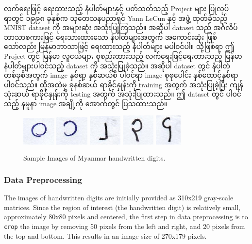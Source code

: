 လက်ရေးဖြင့် ရေးထားသည့် နံပါတ်များနှင့် ပတ်သတ်သည့် Project များ ပြုလုပ်ရာတွင် ၁၉၉၈ ခုနှစ်က သုတေသနပညာရှင် Yann LeCun နှင့် အဖွဲ့ ထုတ်ခဲ့သည့်  MNIST dataset ကို အများဆုံး အသုံးပြုကြသည်။ အဆိုပါ dataset သည်  အင်္ဂလိပ် ဘာသာစကားဖြင့် ရေးသားထားသော နံပါတ်များအတွက် အကောင်းဆုံး ဖြစ်သော်လည်း မြန်မာဘာသာဖြင့် ရေးထားသည့် နံပါတ်များ မပါ၀င်ပါ။ သို့ဖြစ်ရာ ဤ Project တွင် မြန်မာ လူငယ်များ စုစည်းထားသည့် လက်ရေးဖြင့်ရေးထားသည့် မြန်မာ နံပါတ်များပါ၀င်သည့် dataset ကို အသုံးပြုခဲ့သည်။ အဆိုပါ dataset တွင် နံပါတ် တစ်ခုစီအတွက် image နှစ်ရာ့ နှစ်ဆယ်စီ ပါ၀င်ရာ image စုစုပေါင်း နှစ်ထောင့်နှစ်ရာ ပါ၀င်သည်။ ထိုအထဲမှ ခုနစ်ဆယ် ရာခိုင်နှုန်းကို training အတွက် အသုံးပြုခဲ့ပြီး ကျန် သုံးဆယ် ရာခိုင်နှုန်းကို testing အတွက် အသုံးပြုထားသည်။ ဤ dataset တွင် ပါ၀င်သည့် နမူနာ image အချို့ကို အောက်တွင် ပြသထားသည်။ 

\vspace{0.5em}
\begin{figure}[h]%
\centering 
\includegraphics[width=0.15\textwidth]{imgs/0.jpg}
\includegraphics[width=0.15\textwidth]{imgs/1.jpg}
\includegraphics[width=0.15\textwidth]{imgs/2.jpg}
\includegraphics[width=0.15\textwidth]{imgs/3.jpg}
\includegraphics[width=0.12\textwidth]{imgs/4.jpg}
\caption{Sample Images of Myanmar handwritten digits.}\label{fig:p2MMdigits}
\end{figure}

\subsubsection{Data Preprocessing}
The images of handwritten digits are initially provided as 310x219 gray-scale matrices. Since the region of interest (the handwritten digit) is relatively small, approximately 80x80 pixels and centered, the first step in data preprocessing is to \texttt{crop} the image by removing 50 pixels from the left and right, and 20 pixels from the top and bottom. This results in an image size of 270x179 pixels. 

